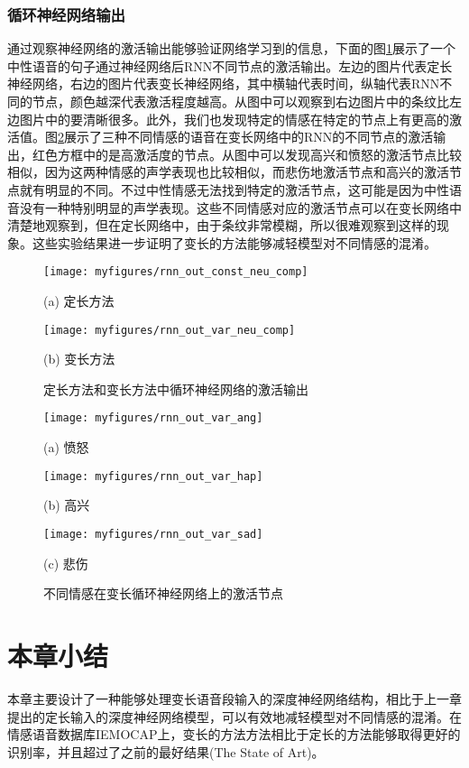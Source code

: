 \subsubsection{循环神经网络输出}
\label{sec:var_len_experiement_rnn}

通过观察神经网络的激活输出能够验证网络学习到的信息，下面的图\ref{fig:rnn_out_comp}展示了一个中性语音的句子通过神经网络后RNN不同节点的激活输出。左边的图片代表定长神经网络，右边的图片代表变长神经网络，其中横轴代表时间，纵轴代表RNN不同的节点，颜色越深代表激活程度越高。从图中可以观察到右边图片中的条纹比左边图片中的要清晰很多。此外，我们也发现特定的情感在特定的节点上有更高的激活值。图\ref{fig:rnn_out_emotions}展示了三种不同情感的语音在变长网络中的RNN的不同节点的激活输出，红色方框中的是高激活度的节点。从图中可以发现高兴和愤怒的激活节点比较相似，因为这两种情感的声学表现也比较相似，而悲伤地激活节点和高兴的激活节点就有明显的不同。不过中性情感无法找到特定的激活节点，这可能是因为中性语音没有一种特别明显的声学表现。这些不同情感对应的激活节点可以在变长网络中清楚地观察到，但在定长网络中，由于条纹非常模糊，所以很难观察到这样的现象。这些实验结果进一步证明了变长的方法能够减轻模型对不同情感的混淆。

\begin{figure}[htb]
\begin{minipage}{0.48\textwidth}
    \centering
    \texttt{[image: myfigures/rnn\_out\_const\_neu\_comp]}
    \centerline{(a) 定长方法}\medskip
\end{minipage}\hfill
\begin{minipage}{0.48\textwidth}
    \centering
    \texttt{[image: myfigures/rnn\_out\_var\_neu\_comp]}
    \centerline{(b) 变长方法}\medskip
\end{minipage}
\caption{定长方法和变长方法中循环神经网络的激活输出}
\label{fig:rnn_out_comp}
\end{figure}

\begin{figure}[htb]
\begin{minipage}{0.33\textwidth}
    \centering
    \texttt{[image: myfigures/rnn\_out\_var\_ang]}
    \centerline{(a) 愤怒}\medskip
\end{minipage}\hfill
\begin{minipage}{0.33\textwidth}
    \centering
    \texttt{[image: myfigures/rnn\_out\_var\_hap]}
    \centerline{(b) 高兴}\medskip
\end{minipage}
\begin{minipage}{0.33\textwidth}
    \centering
    \texttt{[image: myfigures/rnn\_out\_var\_sad]}
    \centerline{(c) 悲伤}\medskip
\end{minipage}
\caption{不同情感在变长循环神经网络上的激活节点}
\label{fig:rnn_out_emotions}
\end{figure}

\section{本章小结}
\label{sec:var_len_summary}

本章主要设计了一种能够处理变长语音段输入的深度神经网络结构，相比于上一章提出的定长输入的深度神经网络模型，可以有效地减轻模型对不同情感的混淆。在情感语音数据库IEMOCAP上，变长的方法方法相比于定长的方法能够取得更好的识别率，并且超过了之前的最好结果(The State of Art)。